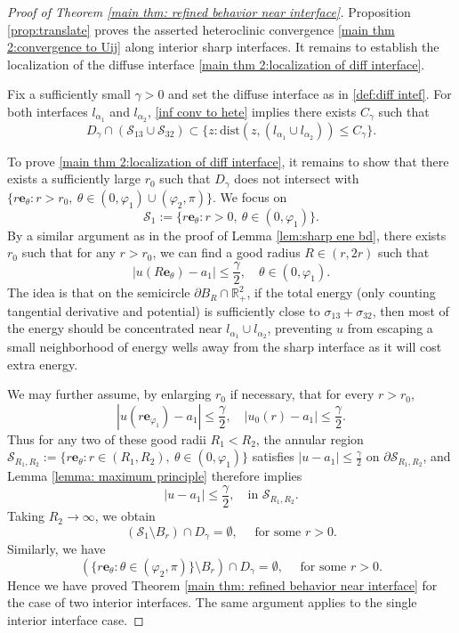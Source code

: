 \documentclass[leqno,11pt]{amsart}
\let\pa=\partial
\let\al=\alpha
\let\g=\gamma
\let\f=\frac
\let\pa=\partial
\theoremstyle{remark}
\newcommand{\dist}{\mathrm{dist}}
\newcommand{\BR}{\mathbb{R}}
\begin{document}
\begin{proof}[Proof of Theorem \ref{main thm: refined behavior near interface}]
Proposition \ref{prop:translate} proves the asserted heteroclinic convergence \eqref{main thm 2:convergence to Uij} along interior sharp interfaces. It remains to establish the 
localization of the diffuse interface \eqref{main thm 2:localization of diff interface}.

Fix a sufficiently small $\gamma>0$ and set the diffuse interface as in \eqref{def:diff intef}. For both interfaces $l_{\al_1}$ and $l_{\al_2}$, \eqref{inf conv to hete} implies there exists  $C_\gamma$ such that
\begin{equation}\label{localization in calS}
 D_\gamma\cap(\mathcal{S}_{13}\cup \mathcal{S}_{32})
 \subset\{z:\dist(z,(l_{\al_1}\cup l_{\al_2}))\leq C_\gamma\}.
\end{equation}

To prove \eqref{main thm 2:localization of diff interface}, it remains to show that there exists a sufficiently large $r_0$ such that $D_\g$ does not intersect with $\{r\mathbf{e}_\theta: r>r_0,\ \theta\in(0,\varphi_1)\cup(\varphi_2,\pi)\}$. We focus on 
\[
\mathcal{S}_1:= \{r\mathbf{e}_\theta: r>0, \ \theta\in(0,\varphi_1)\}.
\]
By a similar argument as in the proof of Lemma \ref{lem:sharp ene bd}, there exists $r_0$ such that for any $r>r_0$, we can find a good radius $R\in (r,2r)$ such that
\[
|u(R\mathbf{e}_{\theta})-a_1|\leq \f{\g}{2}, \quad \theta \in(0,\varphi_1).
\]
The idea is that on the semicircle $\pa B_{R}\cap \BR_+^2$, if the total energy (only counting tangential derivative and potential) is sufficiently close to $\sigma_{13}+\sigma_{32}$, then most of the energy should be concentrated near $l_{\al_1}\cup l_{\al_2}$, preventing $u$ from escaping a small neighborhood of energy wells away from the sharp interface as it will cost extra energy. 

We may further assume, by enlarging $r_0$ if necessary, that for every $r>r_0$,
\[
|u(r\mathbf{e}_{\varphi_1})-a_1|\leq \f{\g}{2},\quad |u_0(r)-a_1|\leq \f{\g}{2}.
\]
Thus for any two of these good radii $R_1<R_2$, the annular region $\mathcal{S}_{R_1,R_2}:=\{r\mathbf{e}_\theta: r\in(R_1,R_2),\ \theta\in(0,\varphi_1)\}$ satisfies $|u-a_1|\leq \f{\g}{2}$ on $\pa \mathcal{S}_{R_1,R_2}$, and Lemma \ref{lemma: maximum principle} therefore implies
\[
|u-a_1|\leq \f{\g}{2},\quad \text{in }\mathcal{S}_{R_1,R_2}.
\]
Taking $R_2\to\infty$, we obtain
\[
(\mathcal{S}_1 \setminus B_{r})\cap D_\g=\emptyset, \quad \text{ for some }r>0.
\]
Similarly, we have 
\[
(\{r\mathbf{e}_\theta: \theta\in(\varphi_2,\pi)\} \setminus B_{r})\cap D_\g=\emptyset, \quad \text{ for some }r>0.
\]
Hence we have proved Theorem \ref{main thm: refined behavior near interface} for the case of two interior interfaces. The same argument applies to the single interior interface case. 

\end{proof}









\end{document}
